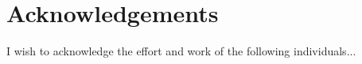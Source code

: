 \chapter*{Acknowledgements}
\thispagestyle{empty}

I wish to acknowledge the effort and work of the following individuals...

\clearpage